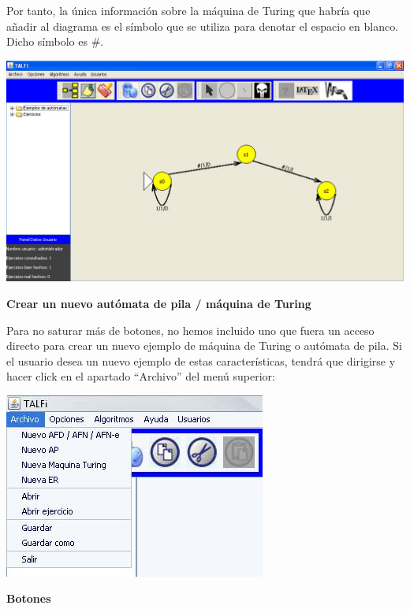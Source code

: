 \documentclass[12pt,a4paper,spanish]{book}
\begin{document}
Por tanto, la \'unica informaci\'on sobre la m\'aquina
de Turing que habr\'ia que a\~nadir al diagrama es el s\'imbolo que se utiliza para
denotar el espacio en blanco. Dicho s\'imbolo es \#. \\
\begin{center}
\includegraphics[width=\textwidth]{graficoaristasparaturing.jpg} \\
\end{center}



{\bf Crear un nuevo aut\'omata de pila / m\'aquina de Turing\\}

Para no saturar m\'as de botones, no hemos incluido uno que fuera un acceso directo para crear un nuevo ejemplo de m\'aquina de Turing o aut\'omata de pila. Si el usuario desea un nuevo ejemplo de estas caracter\'isticas, tendr\'a que dirigirse y hacer click en el apartado ``Archivo'' del men\'u superior:\\
\begin{center}
\includegraphics[width=\textwidth]{roci2.jpg}
\end{center}
{\bf  Botones\\}
\end{document}
